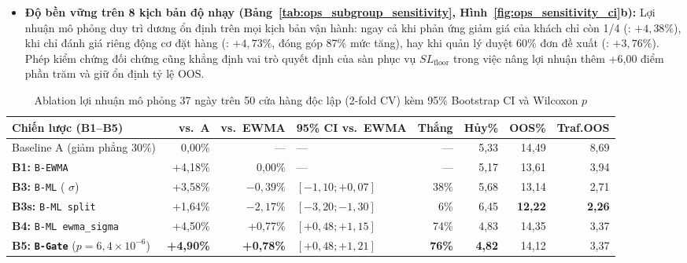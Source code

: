 \begin{itemize}
    \item \textbf{Độ bền vững trên 8 kịch bản độ nhạy (Bảng~\ref{tab:ops_subgroup_sensitivity}, Hình~\ref{fig:ops_sensitivity_ci}b):} Lợi nhuận mô phỏng duy trì dương ổn định trên mọi kịch bản vận hành: ngay cả khi phản ứng giảm giá của khách chỉ còn 1/4 (: $+4{,}38\%$), khi chỉ đánh giá riêng động cơ đặt hàng (: $+4{,}73\%$, đóng góp 87\% mức tăng), hay khi quản lý duyệt 60\% đơn đề xuất (: $+3{,}76\%$). Phép kiểm chứng đối chứng  cũng khẳng định vai trò quyết định của sàn phục vụ $SL_{\text{floor}}$ trong việc nâng lợi nhuận thêm +6,00 điểm phần trăm và giữ ổn định tỷ lệ OOS.
\end{itemize}

\begin{table}[H]
\centering
\caption{Ablation lợi nhuận mô phỏng 37 ngày trên 50 cửa hàng độc lập (2-fold CV) kèm 95\% Bootstrap CI và Wilcoxon $p$}
\label{tab:ops_chest_backtest}
\footnotesize
\setlength{\tabcolsep}{3pt}
\begin{tabularx}{\textwidth}{Y r r L{2.35cm} r r r r}
\toprule
\textbf{Chiến lược (B1--B5)} & \textbf{vs.\ A} & \textbf{vs.\ EWMA} & \textbf{95\% CI vs.\ EWMA} & \textbf{Thắng} & \textbf{Hủy\%} & \textbf{OOS\%} & \textbf{Traf.OOS} \\
\midrule
Baseline A (giảm phẳng 30\%) & 0,00\% & --- & --- & --- & 5,33 & 14,49 & 8,69 \\
\textbf{B1:} \texttt{B-EWMA} & +4,18\% & 0,00\% & --- & --- & 5,17 & 13,61 & 3,94 \\
\textbf{B3:} \texttt{B-ML} ( $\sigma$) & +3,58\% & $-0{,}39\%$ & $[-1{,}10; +0{,}07]$ & 38\% & 5,68 & 13,14 & 2,71 \\
\textbf{B3s:} \texttt{B-ML split} & +1,64\% & $-2{,}17\%$ & $[-3{,}20; -1{,}30]$ & 6\% & 6,45 & \textbf{12,22} & \textbf{2,26} \\
\textbf{B4:} \texttt{B-ML ewma\_sigma} & +4,50\% & +0,77\% & $[+0{,}48; +1{,}15]$ & 74\% & 4,83 & 14,35 & 3,37 \\
\textbf{B5:} \textbf{\texttt{B-Gate}} ($p=6{,}4\times 10^{-6}$) & \textbf{+4,90\%} & \textbf{+0,78\%} & \textbf{$[+0{,}48; +1{,}21]$} & \textbf{76\%} & \textbf{4,82} & 14,12 & 3,37 \\
\bottomrule
\end{tabularx}
\end{table}

